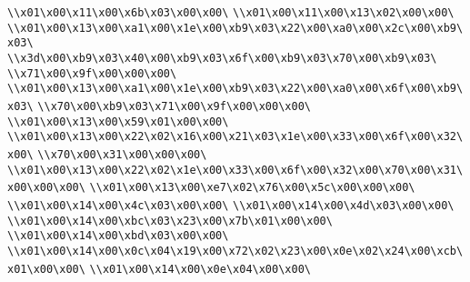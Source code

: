 \verb|\\x01\x00\x11\x00\x6b\x03\x00\x00\|\newline
\verb|\\x01\x00\x11\x00\x13\x02\x00\x00\|\newline
\verb|\\x01\x00\x13\x00\xa1\x00\x1e\x00\xb9\x03\x22\x00\xa0\x00\x2c\x00\xb9\x03\|\newline
\verb|\\x3d\x00\xb9\x03\x40\x00\xb9\x03\x6f\x00\xb9\x03\x70\x00\xb9\x03\|\newline
\verb|\\x71\x00\x9f\x00\x00\x00\|\newline
\verb|\\x01\x00\x13\x00\xa1\x00\x1e\x00\xb9\x03\x22\x00\xa0\x00\x6f\x00\xb9\x03\|\newline
\verb|\\x70\x00\xb9\x03\x71\x00\x9f\x00\x00\x00\|\newline
\verb|\\x01\x00\x13\x00\x59\x01\x00\x00\|\newline
\verb|\\x01\x00\x13\x00\x22\x02\x16\x00\x21\x03\x1e\x00\x33\x00\x6f\x00\x32\x00\|\newline
\verb|\\x70\x00\x31\x00\x00\x00\|\newline
\verb|\\x01\x00\x13\x00\x22\x02\x1e\x00\x33\x00\x6f\x00\x32\x00\x70\x00\x31\x00\x00\x00\|\newline
\verb|\\x01\x00\x13\x00\xe7\x02\x76\x00\x5c\x00\x00\x00\|\newline
\verb|\\x01\x00\x14\x00\x4c\x03\x00\x00\|\newline
\verb|\\x01\x00\x14\x00\x4d\x03\x00\x00\|\newline
\verb|\\x01\x00\x14\x00\xbc\x03\x23\x00\x7b\x01\x00\x00\|\newline
\verb|\\x01\x00\x14\x00\xbd\x03\x00\x00\|\newline
\verb|\\x01\x00\x14\x00\x0c\x04\x19\x00\x72\x02\x23\x00\x0e\x02\x24\x00\xcb\x01\x00\x00\|\newline
\verb|\\x01\x00\x14\x00\x0e\x04\x00\x00\|\newline

